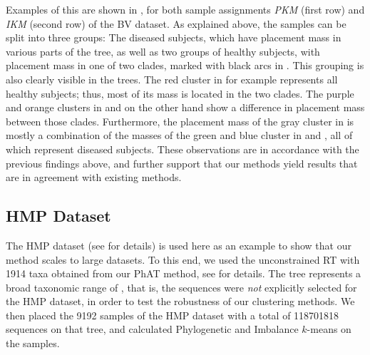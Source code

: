 Examples of this are shown in ,
for both sample assignments \emph{PKM} (first row) and \emph{IKM} (second row) of the \ac{BV} dataset.
As explained above, the samples can be split into three groups:
The diseased subjects, which have placement mass in various parts of the tree,
as well as two groups of healthy subjects, with placement mass in one of two  clades,
marked with black arcs in .
This grouping is also clearly visible in the trees.
The red cluster in  for example represents all healthy subjects;
thus, most of its mass is located in the two  clades.
The purple and orange clusters in  and 
on the other hand show a difference in placement mass between those clades.
Furthermore, the placement mass of the gray cluster in  is mostly
a combination of the masses of the green and blue cluster in  and ,
all of which represent diseased subjects.
These observations are in accordance with the previous findings above,
and further support that our methods yield results that are in agreement with existing methods.


\subsection{HMP Dataset}
\label{ch:Clustering:sec:Results:sub:HMPDataset}

The \acf{HMP} dataset \cite{Huttenhower2012,Methe2012} (see  for details)
is used here as an example to show that our method scales to large datasets.
To this end, we used the unconstrained  \ac{RT} with \num{1 914} taxa
obtained from our \ac{PhAT} method, see  for details.
The tree represents a broad taxonomic range of ,
that is, the sequences were \emph{not} explicitly selected for the \ac{HMP} dataset,
in order to test the robustness of our clustering methods.
We then placed the \num{9 192} samples of the \ac{HMP} dataset with a total of \num{118 701 818} sequences on that tree,
and calculated Phylogenetic and Imbalance $k$-means on the samples.

